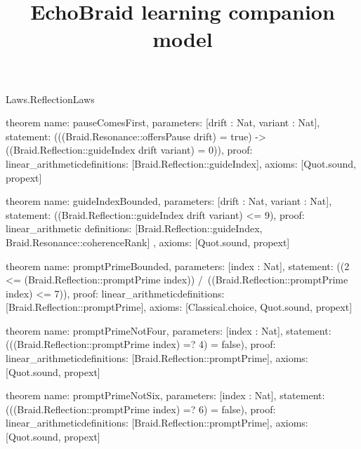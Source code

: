 \begin{lexlean}{Laws.ReflectionLaws}
\title{EchoBraid learning companion model}
\begin{semanticmodule}
theorem{
  name: pauseComesFirst,
  parameters: [drift : Nat, variant : Nat],
  statement: (((Braid.Resonance::offersPause drift) = true) -> ((Braid.Reflection::guideIndex drift variant) = 0)),
  proof: linear_arithmetic{definitions: [Braid.Reflection::guideIndex]},
  axioms: [Quot.sound, propext]
}

theorem{
  name: guideIndexBounded,
  parameters: [drift : Nat, variant : Nat],
  statement: ((Braid.Reflection::guideIndex drift variant) <= 9),
  proof: linear_arithmetic{
    definitions: [Braid.Reflection::guideIndex, Braid.Resonance::coherenceRank]
  },
  axioms: [Quot.sound, propext]
}

theorem{
  name: promptPrimeBounded,
  parameters: [index : Nat],
  statement: ((2 <= (Braid.Reflection::promptPrime index)) /\ ((Braid.Reflection::promptPrime index) <= 7)),
  proof: linear_arithmetic{definitions: [Braid.Reflection::promptPrime]},
  axioms: [Classical.choice, Quot.sound, propext]
}

theorem{
  name: promptPrimeNotFour,
  parameters: [index : Nat],
  statement: (((Braid.Reflection::promptPrime index) =? 4) = false),
  proof: linear_arithmetic{definitions: [Braid.Reflection::promptPrime]},
  axioms: [Quot.sound, propext]
}

theorem{
  name: promptPrimeNotSix,
  parameters: [index : Nat],
  statement: (((Braid.Reflection::promptPrime index) =? 6) = false),
  proof: linear_arithmetic{definitions: [Braid.Reflection::promptPrime]},
  axioms: [Quot.sound, propext]
}
\end{semanticmodule}
\end{lexlean}
